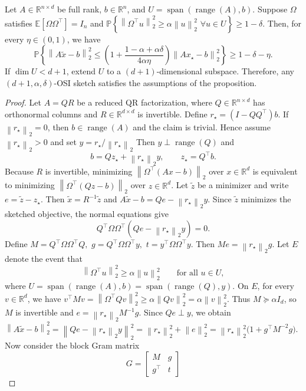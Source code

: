 \documentclass[onefignum,onetabnum]{siamart251216}
\newcommand{\R}{\mathbb{R}}
\newcommand{\E}{\mathbb{E}}
\newcommand{\Prob}{\mathbb{P}}
\newcommand{\norm}[1]{\left\lVert #1 \right\rVert}
\newcommand{\range}{\operatorname{range}}
\begin{document}
\begin{proposition}
\label{prop:ls-p-one}
Let $A\in\R^{n\times d}$ be full rank,  $b\in\R^n$, and $U = \operatorname{span}(\range(A),b)$.  Suppose $\Omega$ satisfies $\E[\Omega\Omega^\top] = I_n$ and $\Prob\!\left\{
\norm{\Omega^\top u}_2^2 \ge \alpha \norm{u}_2^2\,\, \forall u \in U\right\}\ge 1 - \delta$.  Then,  for every $\eta\in(0,1)$, we have
\[
\Prob\!\left\{
\norm{A\widetilde x-b}_2^2
\le
\left(1+\frac{1-\alpha+\alpha\delta}{4\alpha\eta}\right)\norm{Ax_\star-b}_2^2
\right\}
\ge 1-\delta-\eta.
\]
If $\dim U<d+1$, extend $U$ to a $(d+1)$-dimensional subspace. Therefore, any $(d+1,\alpha,\delta)$-OSI sketch satisfies the assumptions of the proposition.
\end{proposition}
\begin{proof}
Let $A=QR$ be a reduced QR factorization, where $Q\in\R^{n\times d}$ has orthonormal
columns and $R\in\R^{d\times d}$ is invertible. Define
$
r_\star = (I-QQ^\top)b.
$
If $\norm{r_\star}_2=0$, then $b\in\range(A)$ and the claim is trivial. Hence assume $\norm{r_\star}_2>0$ and set
$
y = r_\star/\norm{r_\star}_2
$
Then $y\perp\range(Q)$ and
\[
b = Qz_\star + \norm{r_\star}_2 y,
\qquad
z_\star = Q^\top b.
\]
Because $R$ is invertible, minimizing $\norm{\Omega^\top(Ax-b)}_2$ over $x\in\R^d$ is
equivalent to minimizing
$
\norm{\Omega^\top(Qz-b)}_2
$
over $z\in\R^d$. Let $\widetilde z$ be a minimizer and write
$
e = \widetilde z-z_\star.
$
Then $\widetilde x = R^{-1}\widetilde z$ and
$
A\widetilde x-b = Qe-\norm{r_\star}_2 y.
$
Since $\widetilde z$ minimizes the sketched objective, the normal equations give
\[
Q^\top\Omega\Omega^\top(Qe-\norm{r_\star}_2 y)=0.
\]
Define
$
M = Q^\top\Omega\Omega^\top Q,$ 
$
g = Q^\top\Omega\Omega^\top y,$
$
t = y^\top\Omega\Omega^\top y.$
Then
$
Me = \norm{r_\star}_2 g.
$
Let $E$ denote the event that
\[
\norm{\Omega^\top u}_2^2 \ge \alpha\norm{u}_2^2
\qquad \text{for all } u\in U, 
\]
where $U = \operatorname{span}(\range(A),b) = \operatorname{span}(\range(Q),y)$.  On $E$, for every $v\in\R^d$, we have
$
v^\top Mv
=
\norm{\Omega^\top Qv}_2^2
\ge\alpha\norm{Qv}_2^2
=
\alpha\norm{v}_2^2.
$
Thus $M\succeq \alpha I_d$, so $M$ is invertible and
$
e = \norm{r_\star}_2 M^{-1}g.
$
Since $Qe\perp y$, we obtain
$
\norm{A\widetilde x-b}_2^2
=
\norm{Qe-\norm{r_\star}_2 y}_2^2
=
\norm{r_\star}_2^2+\norm{e}_2^2
=
\norm{r_\star}_2^2\bigl(1+g^\top M^{-2}g\bigr).
$
Now consider the block Gram matrix
\[
G =
\begin{bmatrix}
M & g\\
g^\top & t
\end{bmatrix}
\]
\end{proof}
\end{document}
